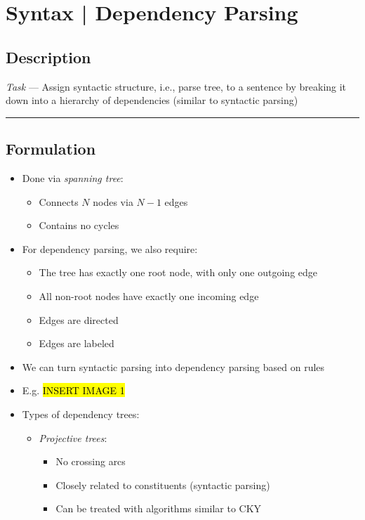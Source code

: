 \section{Syntax | Dependency Parsing}
\subsection*{Description}
\emph{Task} --- Assign syntactic structure, i.e., parse tree, to a sentence by breaking it down into a hierarchy of dependencies (similar to syntactic parsing)

{\color{black}\hrule height 0.001mm}

\subsection*{Formulation}
\begin{itemize}
    \item Done via \emph{spanning tree}:
    \begin{itemize}
        \item Connects $N$ nodes via $N-1$ edges
        \item Contains no cycles
    \end{itemize}
    \item For dependency parsing, we also require:
    \begin{itemize}
        \item The tree has exactly one root node, with only one outgoing edge
        \item All non-root nodes have exactly one incoming edge
        \item Edges are directed
        \item Edges are labeled
    \end{itemize}
    \item We can turn syntactic parsing into dependency parsing based on rules
    \item E.g. \hl{INSERT IMAGE 1}
    \item Types of dependency trees:
    \begin{itemize}
        \item \emph{Projective trees}:
        \begin{itemize}
            \item No crossing arcs
            \item Closely related to constituents (syntactic parsing)
            \item Can be treated with algorithms similar to CKY

\end{itemize}
\end{itemize}
\end{itemize}
